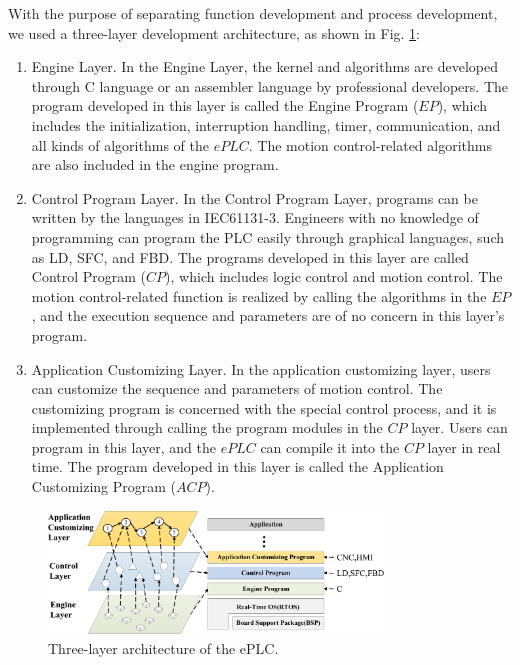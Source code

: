 \documentclass[journal]{IEEEtran}
\begin{document}
With the purpose of separating function development and process development, we used a three-layer development architecture, as shown in Fig. \ref{fig:threelayerarchitecture}:
\begin{enumerate}
\item Engine Layer. In the Engine Layer, the kernel and algorithms are developed through C language or an assembler language by professional developers. The program developed in this layer is called the Engine Program ($EP$), which includes the initialization, interruption handling, timer, communication, and all kinds of algorithms of the $ePLC$. The motion control-related algorithms are also included in the engine program.

\item Control Program Layer. In the Control Program Layer, programs can be written by the languages in IEC61131-3. Engineers with no knowledge of programming can program the PLC easily through graphical languages, such as LD, SFC, and FBD. The programs developed in this layer are called Control Program ($CP$), which includes logic control and motion control. The motion control-related function is realized by calling the algorithms in the $EP$, and the execution sequence and parameters are of no concern in this layer's program.


\item Application Customizing Layer. In the application customizing layer, users can customize the sequence and parameters of motion control. The customizing program is concerned with the special control process, and it is implemented through calling the program modules in the $CP$ layer. Users can program in this layer, and the $ePLC$ can compile it into the $CP$ layer in real time. The program developed in this layer is called the Application Customizing Program ($ACP$).


\end{enumerate}

\begin{figure}
\centering
\includegraphics[width=3.5in]{fig/FIG4_TII-18-0024.eps}
\caption{Three-layer architecture of the ePLC.}
\label{fig:threelayerarchitecture}
\end{figure}
\end{document}
